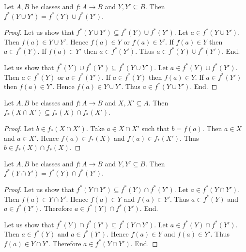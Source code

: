 \documentclass[10pt]{article}
\begin{document}
  \begin{forthel}
    \begin{proposition}[id=FOUNDATIONS_07_1547089051910144,printid]
      Let $A, B$ be classes and $f : A \to B$ and $Y, Y' \subseteq B$.
      Then $f^{*}(Y \cup Y') = f^{*}(Y) \cup f^{*}(Y')$.
    \end{proposition}
    \begin{proof}
      Let us show that $f^{*}(Y \cup Y') \subseteq f^{*}(Y) \cup f^{*}(Y')$.
        Let $a \in f^{*}(Y \cup Y')$.
        Then $f(a) \in Y \cup Y'$.
        Hence $f(a) \in Y$ or $f(a) \in Y'$.
        If $f(a) \in Y$ then $a \in f^{*}(Y)$.
        If $f(a) \in Y'$ then $a \in f^{*}(Y')$.
        Thus $a \in f^{*}(Y) \cup f^{*}(Y')$.
      End.

      Let us show that $f^{*}(Y) \cup f^{*}(Y') \subseteq f^{*}(Y \cup Y')$.
        Let $a \in f^{*}(Y) \cup f^{*}(Y')$.
        Then $a \in f^{*}(Y)$ or $a \in f^{*}(Y')$.
        If $a \in f^{*}(Y)$ then $f(a) \in Y$.
        If $a \in f^{*}(Y')$ then $f(a) \in Y'$.
        Hence $f(a) \in Y \cup Y'$.
        Thus $a \in f^{*}(Y \cup Y')$.
      End.
    \end{proof}
  \end{forthel}

  \begin{forthel}
    \begin{proposition}[id=FOUNDATIONS_07_3966130473402368,printid]
      Let $A, B$ be classes and $f : A \to B$ and $X, X' \subseteq A$.
      Then $f_{*}(X \cap X') \subseteq f_{*}(X) \cap f_{*}(X')$.
    \end{proposition}
    \begin{proof}
      Let $b \in f_{*}(X \cap X')$.
      Take $a \in X \cap X'$ such that $b = f(a)$.
      Then $a \in X$ and $a \in X'$.
      Hence $f(a) \in f_{*}(X)$ and $f(a) \in f_{*}(X')$.
      Thus $b \in f_{*}(X) \cap f_{*}(X)$.
    \end{proof}
  \end{forthel}

  \begin{forthel}
    \begin{proposition}[id=FOUNDATIONS_07_4021844428455936,printid]
      Let $A, B$ be classes and $f : A \to B$ and $Y, Y' \subseteq B$.
      Then $f^{*}(Y \cap Y') = f^{*}(Y) \cap f^{*}(Y')$.
    \end{proposition}
    \begin{proof}
      Let us show that $f^{*}(Y \cap Y') \subseteq f^{*}(Y) \cap f^{*}(Y')$.
        Let $a \in f^{*}(Y \cap Y')$.
        Then $f(a) \in Y \cap Y'$.
        Hence $f(a) \in Y$ and $f(a) \in Y'$.
        Thus $a \in f^{*}(Y)$ and $a \in f^{*}(Y')$.
        Therefore $a \in f^{*}(Y) \cap f^{*}(Y')$.
      End.

      Let us show that $f^{*}(Y) \cap f^{*}(Y') \subseteq f^{*}(Y \cap Y')$.
        Let $a \in f^{*}(Y) \cap f^{*}(Y')$.
        Then $a \in f^{*}(Y)$ and $a \in f^{*}(Y')$.
        Hence $f(a) \in Y$ and $f(a) \in Y'$.
        Thus $f(a) \in Y \cap Y'$.
        Therefore $a \in f^{*}(Y \cap Y')$.
      End.
    \end{proof}
  \end{forthel}
\end{document}
